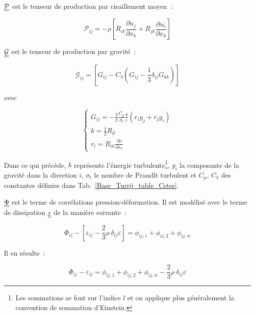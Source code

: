 $\underline{\underline{\mathcal{P}}}$ est le tenseur de production par cisaillement moyen~:

\begin{equation}
\displaystyle \mathcal{P}_{ij} = \displaystyle -\rho \left[ R_{ik} \frac{\partial u_j}{\partial x_k} + R_{jk} \frac{\partial u_i}{\partial x_k} \right]
\end{equation}


$\underline{\underline{\mathcal{G}}}$ est le tenseur de production par gravité~:

\begin{equation}
\displaystyle
\mathcal{G}_{ij}= \left[ G_{ij} - C_3 (G_{ij}-\frac{1}{3} \delta_{ij} G_{kk}) \right]
\end{equation}

avec

\begin{equation}
\left\{
\begin{array} {c}
\displaystyle G_{ij} = - \frac{3}{2} \frac{C_{\mu}}{\sigma_{t}} \frac{k}{\varepsilon} (r_i g_j + r_j g_i) \\
\displaystyle k = \frac{1}{2} R_{ll} \\
\displaystyle r_i = R_{ik} \frac{\partial \rho}{\partial x_k}
\end{array}\right.
\end{equation}

Dans ce qui précède, $k$ représente l'énergie turbulente\footnote{Les
sommations se font sur l'indice $l$ et on applique plus
généralement la convention de sommation d'Einstein.}, $g_i$ la composante de
la gravité dans la direction $i$, $\sigma_{t}$ le nombre de Prandlt turbulent  et $C_{\mu}$, $C_3$ des constantes définies dans Tab.~\ref{Base_Turrij_table_Cstes}.


$\underline{\underline{\Phi}}$ est le terme de corrélations pression-déformation. Il est modélisé avec le terme de dissipation $\underline{\underline{\varepsilon}}$ de la manière suivante~:

\begin{equation}
\displaystyle
\Phi_{ij} - [\varepsilon_{ij}- \frac{2}{3} \rho \ \delta_{ij} \varepsilon] = \phi_{ij,1} + \phi_{ij,2} + \phi_{ij,w}
\end{equation}

Il en résulte~:

\begin{equation}
\displaystyle
\Phi_{ij} - \varepsilon_{ij} = \phi_{ij,1} + \phi_{ij,2} + \phi_{ij,w}  -\frac{2}{3} \rho \ \delta_{ij} \varepsilon
\end{equation}

